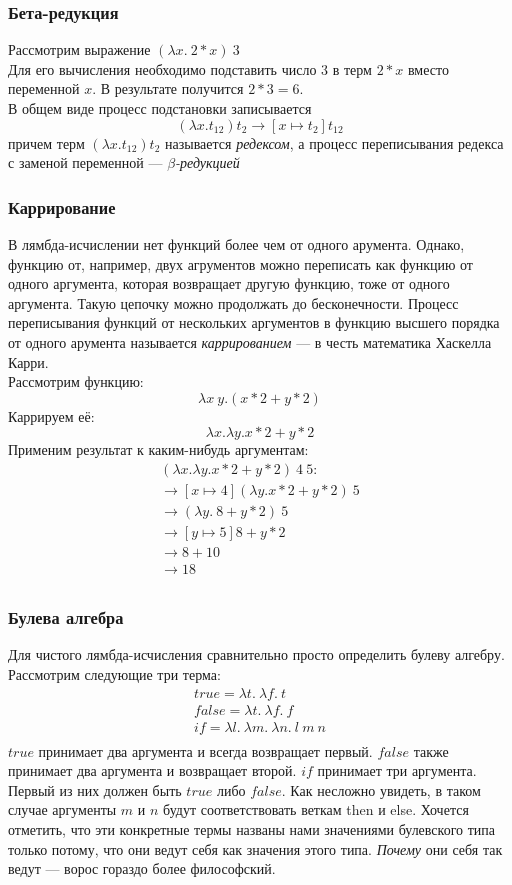 \documentclass[a4paper, 12pt, titlepage, twoside]{article}
\begin{document}
\subsubsection{Бета-редукция}
Рассмотрим выражение $(\lambda x.\ 2*x)\ 3$\\
Для его вычисления необходимо подставить число $3$ в терм $2 * x$ вместо переменной $x$. В результате получится $2 * 3 = 6$.\\
В общем виде процесс подстановки записывается \[(\lambda x.t_{12}) t_2\longrightarrow [x\mapsto t_2]t_{12}\]
причем терм $(\lambda x.t_{12}) t_2$ называется \textit{редексом}, а процесс переписывания редекса с заменой переменной --- \textit{$\beta$-редукцией}
\subsubsection{Каррирование}
В лямбда-исчислении нет функций более чем от одного арумента. Однако, функцию от, например, двух агрументов можно переписать как функцию от одного аргумента, которая возвращает другую функцию, тоже от одного аргумента. Такую цепочку можно продолжать до бесконечности. Процесс переписывания функций от нескольких аргументов в функцию высшего порядка от одного арумента называется \textit{каррированием} --- в честь математика Хаскелла Карри.\\
Рассмотрим функцию:
\[
\lambda x\ y.(x * 2 + y * 2)
\]
Каррируем её:
\[
\lambda x.\lambda y.x * 2 + y * 2
\]
Применим результат к каким-нибудь аргументам:
\[
\begin{array}{l}
  (\lambda x.\lambda y.x * 2 + y * 2)\ 4\ 5:\\
  \longrightarrow [x\mapsto 4](\lambda y.x * 2 + y * 2)\ 5\\
  \longrightarrow (\lambda y.\ 8 + y * 2)\ 5\\
  \longrightarrow [y\mapsto 5]8 + y * 2\\
  \longrightarrow 8 + 10\\
  \longrightarrow 18\\
\end{array}
\]
\subsubsection{Булева алгебра}
Для чистого лямбда-исчисления сравнительно просто определить булеву алгебру. Рассмотрим следующие три терма:
\[
\begin{array}{l}
  true = \lambda t.\ \lambda f.\ t\\
  false = \lambda t.\ \lambda f.\ f\\
  if = \lambda l.\ \lambda m.\ \lambda n.\ l\ m\ n\\
\end{array}
\]
  $true$ принимает два аргумента и всегда возвращает первый. $false$ также принимает два аргумента и возвращает второй. $if$ принимает три аргумента. Первый из них должен быть $true$ либо $false$. Как несложно увидеть, в таком случае аргументы $m$ и $n$ будут соответствовать веткам then и else. Хочется отметить, что эти конкретные термы названы нами значениями булевского типа только потому, что они ведут себя как значения этого типа. \textit{Почему} они себя так ведут --- ворос гораздо более философский.
\end{document}
